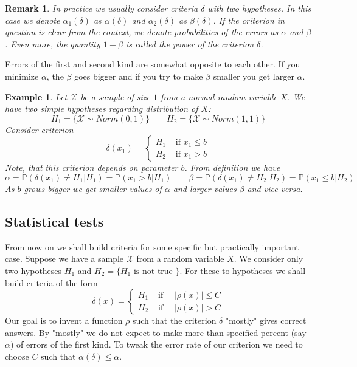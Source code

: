 \documentclass[12pt]{article}
\newtheorem{remark}[theorem]{Remark}
\newtheorem{example}[theorem]{Example}
\begin{document}
\begin{remark} In practice we usually consider criteria $\delta$ with two hypotheses. In this case we denote $\alpha_1(\delta)$ as $\alpha(\delta)$ and $\alpha_2(\delta)$ as $\beta(\delta)$. If the criterion in question is clear from the context, we denote probabilities of the errors as $\alpha$ and $\beta$. Even more, the quantity $1-\beta$ is called the power of the criterion $\delta$.
\end{remark}

Errors of the first and second kind are somewhat opposite to each other. If you minimize $\alpha$, the $\beta$ goes bigger and if you try to make $\beta$ smaller you get larger $\alpha$. 

\begin{example} Let $\mathscr{X}$ be a sample of size $1$ from a normal random variable $X$. We have two simple hypotheses regarding distribution of $X$:
$$
H_1=\{\mathscr{X}\sim Norm(0, 1)\}
\quad\quad
H_2=\{\mathscr{X}\sim Norm(1,1)\}
$$
Consider criterion
$$
\delta(x_1)=
\begin{cases}
H_1 & \mbox{ if } x_1\leq b \\
H_2 & \mbox{ if } x_1> b
\end{cases}
$$
Note, that this criterion depends on parameter $b$. From definition we have
$$
\alpha=\mathbb{P}(\delta(x_1)\neq H_1|H_1)=\mathbb{P}(x_1>b|H_1)
\quad\quad
\beta=\mathbb{P}(\delta(x_1)\neq H_2|H_2)=\mathbb{P}(x_1\leq b|H_2)
$$
As $b$ grows bigger we get smaller values of $\alpha$ and larger values $\beta$ and vice versa.
\end{example}


\subsection{Statistical tests}

From now on we shall build criteria for some specific but practically important case. Suppose we have a sample $\mathscr{X}$ from a random variable $X$.  We consider only two hypotheses $H_1$ and $H_2=\{H_1\mbox{ is not true }\}$. For these to hypotheses we shall build criteria of the form
$$
\delta(x)=
\begin{cases}
H_1 & \mbox{ if }\quad |\rho(x)|\leq C \\
H_2 & \mbox{ if }\quad |\rho(x)|> C
\end{cases}
$$
Our goal is to invent a function $\rho$ such that the criterion $\delta$ "mostly" gives correct answers. By "mostly" we do not expect to make more than specified percent (say $\alpha$) of errors of the first kind. To tweak the error rate of our criterion we need to choose $C$ such that $\alpha(\delta)\leq \alpha$. 
\end{document}
